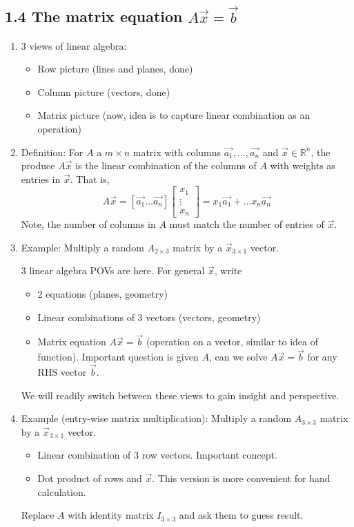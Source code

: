 \documentclass{article}
\begin{document}
\subsection{1.4 The matrix equation $A \vec{x} = \vec{b}$}

\begin{enumerate}

\item 3 views of linear algebra:
\begin{itemize}
\item Row picture (lines and planes, done)
\item Column picture (vectors, done)
\item Matrix picture (now, idea is to capture linear combination as an operation)
\end{itemize}

\item Definition: For $A$ a $m \times n$ matrix with columns $\vec{a_1}, \dots, \vec{a_n}$ and $\vec{x} \in \mathbb{R}^n$, the produce $A\vec{x}$ is the linear combination of the columns of $A$ with weights as entries in $\vec{x}$. That is,
\[
A \vec{x} =
[\vec{a_1} \dots \vec{a_n}]
\left[ 
\begin{array}{c}
x_1 \\
\vdots \\
x_n
\end{array}
\right]
= x_1 \vec{a_1} + \dots x_n \vec{a_n}
\]
Note, the number of columns in $A$ must match the number of entries of $\vec{x}$. 

\item Example: Multiply a random $A_{2 \times 3}$ matrix by a $\vec{x}_{3 \times 1}$ vector. 

3 linear algebra POVs are here. For general $\vec{x}$, write 
\begin{itemize}
\item 2 equations (planes, geometry)
\item Linear combinations of 3 vectors (vectors, geometry)
\item Matrix equation $A \vec{x} = \vec{b}$ (operation on a vector, similar to idea of function). Important question is given $A$, can we solve $A \vec{x} = \vec{b}$ for any RHS vector $\vec{b}$. 
\end{itemize}
We will readily switch between these views to gain insight and perspective.

\item Example (entry-wise matrix multiplication): Multiply a random $A_{3 \times 3}$ matrix by a $\vec{x}_{3 \times 1}$ vector.
\begin{itemize}
\item Linear combination of 3 row vectors. Important concept.
\item Dot product of rows and $\vec{x}$. This version is more convenient for hand calculation.
\end{itemize}
Replace $A$ with identity matrix $I_{3 \times 3}$ and ask them to guess result. 


\end{enumerate}
\end{document}
